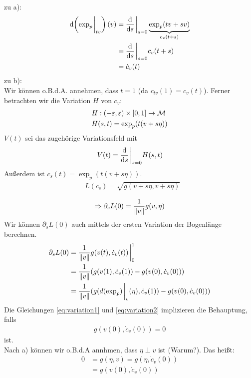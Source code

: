 \begin{bew}
zu a):
\begin{align*}
    \dd(\exp_p\eval_{tv})(v) &= \dv{s}\eval_{s=0} \underbrace{\exp_p (tv + sv )}_{c_v(t+s)}\\
    &= \dv{s} \eval_{s=0} c_v (t+s) \\
    &= \dot{c}_v (t)
\end{align*}
zu b):\\
Wir können o.B.d.A. annehmen, dass $t=1$ (da $c_{tv}(1) = c_v (t)$).
Ferner betrachten wir die Variation $H$ von $c_v$:
\begin{align*}
    &H: (-\varepsilon, \varepsilon)\times[0, 1] \to \mathcal{M}\\
    & H(s, t) = \exp_p (t(v + s \eta))
\end{align*}
$V(t)$ sei das zugehörige Variationsfeld mit
\begin{align*}
    V(t) = \dv{s} \eval_{s=0} H(s,t)
\end{align*}
Außerdem ist $c_s(t) = \exp_p (t(v+s\eta))$.
\begin{align*}
    &L(c_s) = \sqrt{g(v + s \eta, v + s \eta)}\\
\end{align*}
\begin{align}
    \label{eq:variation1}
\Rightarrow \partial_s L(0) = \frac{1}{\norm{v}}g(v, \eta)      
\end{align}
Wir können $\partial_s L(0)$ auch mittels der ersten Variation der Bogenlänge berechnen.
\begin{align*} 
\partial_s L (0) &= \frac{1}{\norm{v}} g(v(t), \dot{c}_v (t))\eval^1_0\\
&= \frac{1}{\norm{v}} (g(v(1), \dot{c}_v (1)) - g(v(0), \dot{c}_v (0)))\\
\label{eq:variation2}
&= \frac{1}{\norm{v}} (g(d(\exp_p)\eval_v (\eta), \dot{c}_v(1)) - g(v(0), \dot{c}_v (0)))
\end{align*}
Die Gleichungen \ref{eq:variation1} und \ref{eq:variation2} implizieren die Behauptung, falls
\begin{align*}
    g(v(0),\dot{c}_v (0)) = 0
\end{align*}
ist.\\
Nach a) können wir o.B.d.A annhmen, dass $\eta \perp v$ ist (Warum?).
Das heißt:
\begin{align*}
    0 &= g(\eta, v) = g(\eta, \dot{c}_v(0))\\
    &= g(v(0), \dot{c}_v (0))
\end{align*}
\end{bew}

